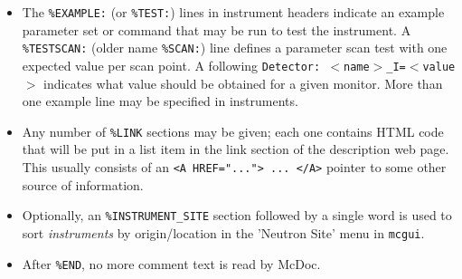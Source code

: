 \begin{itemize}
  \verb+<PRE>+\ldots\verb+</PRE>+, so that the line breaks in the source
  will be obeyed.
\item 
  \sloppy
  The \verb+%EXAMPLE:+ (or \verb+%TEST:+)
  lines in instrument headers indicate an example parameter set or command that may be
  run to test the instrument. A \verb+%TESTSCAN:+ (older name \verb+%SCAN:+) line defines a parameter scan test with one expected value per scan point. A following \texttt{Detector: $<$name$>$\_I=$<$value$>$}
  indicates what value should be obtained for a given monitor. More than one example
  line may be specified in instruments.
\item
  Any number of \verb+%LINK+
  sections may be given; each one contains HTML code that will be put in
  a list item in the link section of the description web page. This
  usually consists of an \verb+<A HREF="..."> ... </A>+ pointer to some
  other source of information.
\item
  Optionally, an \verb+%INSTRUMENT_SITE+ section followed by a single word is used to sort \emph{instruments} by origin/location in the 'Neutron Site' menu in \verb+mcgui+.
\item  {}
  After \verb+%END+, no more comment text is read by McDoc.
\end{itemize}

